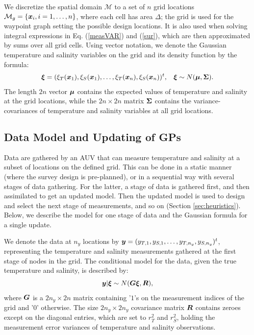 \documentclass[aoas]{imsart}
\begin{document}
We discretize the spatial domain $\mathcal{M}$ to a set of $n$ grid
locations $\mathcal{M}_g = \{{\boldsymbol x}_i, i=1,\ldots,n \}$, where each cell
has area $\Delta$; the grid is used for the waypoint graph setting the
possible design locations. It is also used when solving integral
expressions in Eq. (\ref{measVAR}) and (\ref{sur}), which are then
approximated by sums over all grid cells. Using vector notation, we
denote the Gaussian temperature and salinity variables on the grid and
its density function by the formula:
\begin{equation}\label{prior}
    \bxi = (\xi_T(\bx_1),\xi_S(\bx_1),\ldots,\xi_T(\bx_n),\xi_S(\bx_n))^t, \hspace{3mm}
    \bxi  \sim  N(\bmu, \bSigma). %
\end{equation}
The length $2n$ vector ${\boldsymbol \mu}$ contains the expected values of
temperature and salinity at the grid locations, while the
$2n \times 2n$ matrix ${\boldsymbol \Sigma}$ contains the
variance-covariances of temperature and salinity variables at all grid
locations.

\subsection{Data Model and Updating of GPs}

Data are gathered by an AUV that can measure temperature and salinity
at a subset of locations on the defined grid. This can be done in a
static manner (where the survey design is pre-planned), or in a
sequential way with several stages of data gathering. For the latter,
a stage of data is gathered first, and then assimilated to get an
updated model. Then the updated model is used to design and select the
next stage of measurements, and so on (Section
\ref{sec:heuristics}). Below, we describe the model for one stage of
data and the Gaussian formula for a single update.

We denote the data at $n_y$ locations by
${\boldsymbol y}=(y_{T,1},y_{S,1},\ldots,y_{T,n_y},y_{S,n_y})^t$, representing the
temperature and salinity measurements gathered at the first stage of
nodes in the grid. The conditional model for the data, given the true temperature
and salinity, is described by: 
\begin{equation}\label{likelihood}
\by | \bxi \sim N( \bG \bxi, \bR), %
\end{equation}
where ${\boldsymbol G}$ is a $2n_y \times 2n$ matrix containing '$1$'s on the
measurement indices of the grid and '$0$' otherwise. The size
$2n_y \times 2n_y$ covariance matrix ${\boldsymbol R}$ contains zeroes except on the diagonal entries, which are set to $r^2_T$ and $r^2_S$, holding the measurement error variances of temperature and salinity observations.
\end{document}
